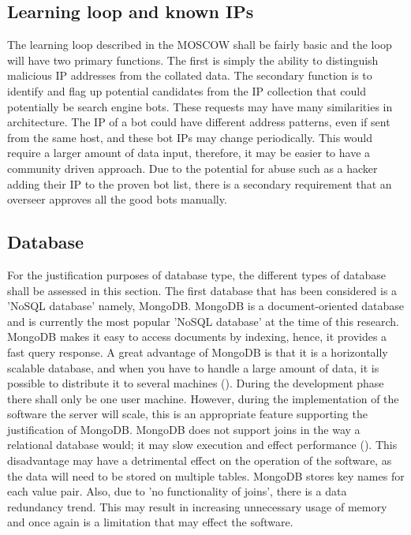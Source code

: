 \subsection*{Learning loop and known IPs} \label{Learning loop and known IP's}

The learning loop described in the MOSCOW shall be fairly basic and the loop will have two primary functions. The first is simply the ability to distinguish malicious IP addresses from the collated data. The secondary function is to identify and flag up potential candidates from the IP collection that could potentially be search engine bots. These requests may have many similarities in architecture. The IP of a bot could have different address patterns, even if sent from the same host, and these bot IPs may change periodically. This would require a larger amount of data input, therefore, it may be easier to have a community driven approach. Due to the potential for abuse such as a hacker adding their IP to the proven bot list, there is a secondary requirement that an overseer approves all the good bots manually.

\subsection*{Database}
For the justification purposes of database type, the different types of database shall be assessed in this section. The first database that has been considered is a 'NoSQL database' namely, MongoDB. MongoDB is a document-oriented database and is currently the most popular 'NoSQL database' at the time of this research. MongoDB makes it easy to access documents by indexing, hence, it provides a fast query response. A great advantage of MongoDB is that it is a horizontally scalable database, and when you have to handle a large amount of data, it is possible to distribute it to several machines (\cite{MongoDB5}). During the development phase there shall only be one user machine. However, during the implementation of the software the server will scale, this is an appropriate feature supporting the justification of MongoDB. MongoDB does not support joins in the way a relational database would; it may slow execution and effect performance (\cite{MongoDBComp}). This disadvantage may have a detrimental effect on the operation of the software, as the data will need to be stored on multiple tables. MongoDB stores key names for each value pair. Also, due to 'no functionality of joins', there is a data redundancy trend. This may result in increasing unnecessary usage of memory and once again is a limitation that may effect the software.

